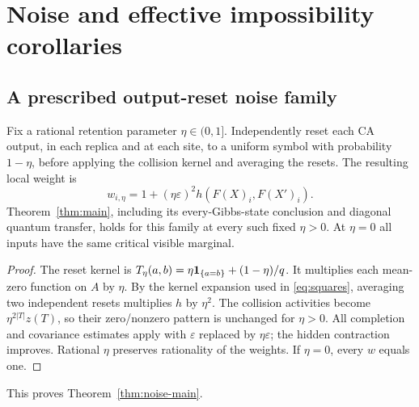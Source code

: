 \section{Noise and effective impossibility corollaries}\label{sec:corollaries}

\subsection{A prescribed output-reset noise family}

\begin{proposition}\label{prop:reset}
Fix a rational retention parameter \(\eta\in(0,1]\). Independently reset each CA output, in each replica and at each site, to a uniform symbol with probability \(1-\eta\), before applying the collision kernel and averaging the resets. The resulting local weight is
\begin{equation}
 w_{i,\eta}=1+(\eta\varepsilon)^2
    h(F(X)_i,F(X')_i).
 \label{eq:reset}
\end{equation}
Theorem~\ref{thm:main}, including its every-Gibbs-state conclusion and diagonal quantum transfer, holds for this family at every such fixed \(\eta>0\). At \(\eta=0\) all inputs have the same critical visible marginal.
\end{proposition}
\begin{proof}
The reset kernel is \(T_\eta(a,b)=\eta\mathbf 1_{\{a=b\}}+(1-\eta)/q\). It multiplies each mean-zero function on \(A\) by \(\eta\). By the kernel expansion used in \eqref{eq:squares}, averaging two independent resets multiplies \(h\) by \(\eta^2\). The collision activities become \(\eta^{2|T|}z(T)\), so their zero/nonzero pattern is unchanged for \(\eta>0\). All completion and covariance estimates apply with \(\varepsilon\) replaced by \(\eta\varepsilon\); the hidden contraction improves. Rational \(\eta\) preserves rationality of the weights. If \(\eta=0\), every \(w\) equals one.
\end{proof}

This proves Theorem~\ref{thm:noise-main}.

